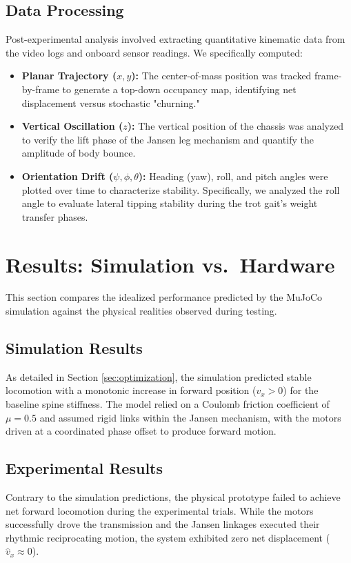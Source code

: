 \documentclass[11pt, a4paper]{article}
\begin{document}
\subsection{Data Processing}
\label{subsec:data-processing}
Post-experimental analysis involved extracting quantitative kinematic data from the video logs and onboard sensor readings. We specifically computed:
\begin{itemize}
    \item \textbf{Planar Trajectory ($x, y$):} The center-of-mass position was tracked frame-by-frame to generate a top-down occupancy map, identifying net displacement versus stochastic "churning."
    \item \textbf{Vertical Oscillation ($z$):} The vertical position of the chassis was analyzed to verify the lift phase of the Jansen leg mechanism and quantify the amplitude of body bounce.
    \item \textbf{Orientation Drift ($\psi, \phi, \theta$):} Heading (yaw), roll, and pitch angles were plotted over time to characterize stability. Specifically, we analyzed the roll angle to evaluate lateral tipping stability during the trot gait's weight transfer phases.
\end{itemize}

\section{Results: Simulation vs.\ Hardware}
\label{sec:results}

This section compares the idealized performance predicted by the MuJoCo simulation against the physical realities observed during testing.

\subsection{Simulation Results}
\label{subsec:results-sim}
As detailed in Section \ref{sec:optimization}, the simulation predicted stable locomotion with a monotonic increase in forward position ($v_x > 0$) for the baseline spine stiffness. The model relied on a Coulomb friction coefficient of $\mu=0.5$ and assumed rigid links within the Jansen mechanism, with the motors driven at a coordinated phase offset to produce forward motion.

\subsection{Experimental Results}
\label{subsec:results-exp}
Contrary to the simulation predictions, the physical prototype failed to achieve net forward locomotion during the experimental trials. While the motors successfully drove the transmission and the Jansen linkages executed their rhythmic reciprocating motion, the system exhibited zero net displacement ($\hat{v}_x \approx 0$).
\end{document}
